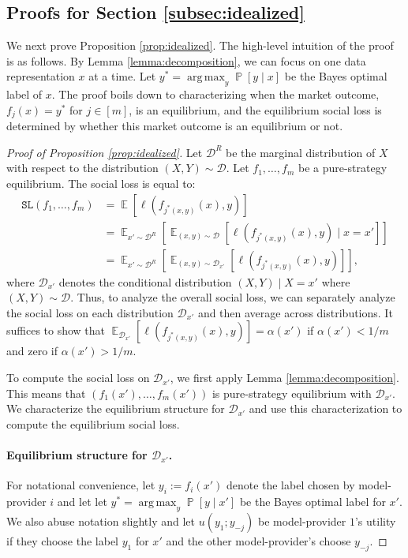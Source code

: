 \documentclass[letterpaper,11pt]{article}
\theoremstyle{plain}
\DeclareMathOperator*{\argmax}{arg\,max}
\DeclareMathOperator*{\E}{\mathbb{E}}
\DeclareMathOperator*{\Prob}{\mathbb{P}}
\begin{document}
\subsection{Proofs for Section \ref{subsec:idealized}}\label{appendix:proofsidealized}


We next prove Proposition \ref{prop:idealized}. The high-level intuition of the proof is as follows. By Lemma \ref{lemma:decomposition}, we can focus on one data representation $x$ at a time. Let $y^* =  \argmax_{y} \Prob[y \mid x]$ be the Bayes optimal label of $x$. The proof boils down to characterizing when the market outcome, $f_j(x) = y^*$ for $j \in [m]$, is an equilibrium, and the equilibrium social loss is determined by whether this market outcome is an equilibrium or not. 
\begin{proof}[Proof of Proposition \ref{prop:idealized}]
Let $\mathcal{D}^R$ be the marginal distribution of $X$ with respect to the distribution $(X,Y) \sim \mathcal{D}$. Let $f_1, \ldots, f_m$ be a pure-strategy equilibrium. The social loss is equal to:
\begin{align*}
 \texttt{SL}(f_1, \ldots, f_m) &= \E[\ell(f_{j^*(x,y)}(x), y)] \\
 &= \E_{x' \sim \mathcal{D}^R} \left[\E_{(x,y) \sim \mathcal{D}}[\ell(f_{j^*(x,y)}(x), y) \mid x = x']\right] \\
 &= \E_{x' \sim \mathcal{D}^R} \left[ \E_{(x,y) \sim \mathcal{D}_{x'}}[\ell(f_{j^*(x,y)}(x), y)]\right], 
\end{align*}
where $\mathcal{D}_{x'}$ denotes the conditional distribution $(X,Y) \mid X = x'$ where $(X,Y) \sim \mathcal{D}$. Thus, to analyze the overall social loss, we can separately analyze the social loss on each distribution $\mathcal{D}_{x'}$ and then average across distributions. It suffices to show that $\E_{\mathcal{D}_{x'}}[\ell(f_{j^*(x,y)}(x), y)] = \alpha(x')$ if $\alpha(x') < 1/m$ and zero if $\alpha(x') > 1/m$. 

To compute the social loss on $\mathcal{D}_{x'}$, we first apply Lemma \ref{lemma:decomposition}. This means that $(f_1(x'), \ldots, f_m(x'))$ is pure-strategy equilibrium with $\mathcal{D}_{x'}$. 
We characterize the equilibrium structure for $\mathcal{D}_{x'}$ and use this characterization to compute the equilibrium social loss. 

\paragraph{Equilibrium structure for $\mathcal{D}_{x'}$.} For notational convenience, let $y_i := f_i(x')$ denote the label chosen by model-provider $i$ and let 
let $y^* =  \argmax_{y} \Prob[y \mid x']$ be the Bayes optimal label for $x'$. We also abuse notation slightly and let $u(y_1; y_{-j})$ be model-provider $1$'s utility if they choose the label $y_1$ for $x'$ and the other model-provider's choose $y_{-j}$. 


\end{proof}
\end{document}

